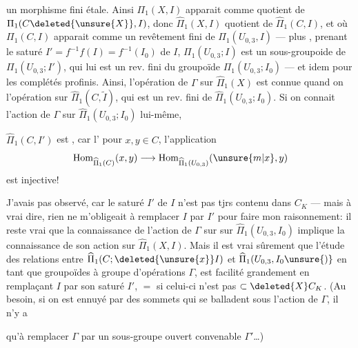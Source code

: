 un morphisme fini étale. Ainsi $\Pi_1(X,I)$ apparait comme quotient de $\Pi_1(C\deleted{\unsure{X}},I)$, donc $\widehat\Pi_1(X,I)$ quotient de $\widehat\Pi_1(C,I)$, et où $\Pi_1(C,I)$ apparait comme un revêtement fini de $\Pi_1(U_{0,3},I)$ --- plus  , prenant le saturé $I'=f^{-1}f(I)=f^{-1}(I_0)$ de $I$, $\Pi_1(U_{0,3};I)$ est un sous-groupoide  de $\Pi_1(U_{0,3};I')$, qui lui est un rev. fini du groupoïde $\Pi_1(U_{0,3};I_0)$ --- et idem pour les complétés profinis. Ainsi, l'opération de $\Gamma$ sur $\widehat\Pi_1(X)$ est connue quand on \unsure{:} l'opération sur $\widehat\Pi_1(C,\widetilde I)$, qui est un rev. fini de $\widehat\Pi_1(U_{0,3};I_0)$. Si on connait l'action de $\Gamma$ sur $\widehat\Pi_1(U_{0,3};I_0)$ lui-même,  

$\widehat\Pi_1(C,I')$ est  , car l' pour $x,y\in C$, l'application
\[
\operatorname{Hom}_{\widehat\Pi_1(C)}(x,y)\longrightarrow\operatorname{Hom}_{\widehat\Pi_1(U_{0,3})}(\unsure{m|x},y)
\]
est injective!

J'avais pas observé, car le saturé $I'$ de $I$  n'est pas tjrs  contenu dans  $C_K$ --- mais à vrai dire, rien ne m'obligeait à remplacer $I$ par $I'$ pour faire mon raisonnement: il reste vrai que la connaissance de l'action de $\Gamma$ sur sur $\widehat\Pi_1(U_{0,3},I_0)$ implique la connaissance de son action sur $\widehat\Pi_1(X,I)$. Mais il est vrai sûrement que l'étude des relations entre $\widehat\Pi_1(C;\deleted{\unsure{x}}I)$ et $\widehat\Pi_1(U_{0,3},I_0\unsure{)}$ en tant que groupoïdes à groupe d'opérations $\Gamma$, est facilité grandement en remplaçant $I$ par son saturé $I'$, $=$ si celui-ci n'est pas $\subset\deleted{X}C_K$. (Au besoin, si on est ennuyé par des sommets qui se balladent sous l'action de $\Gamma$, il n'y a

qu'à remplacer $\Gamma$ par un sous-groupe ouvert convenable $\Gamma'$\ldots)

